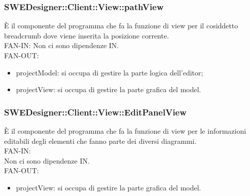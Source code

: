 \documentclass[../DefinizioneDiProdotto.tex]{subfiles}
\begin{document}
				\subsubsection{SWEDesigner::Client::View::pathView}
				È il componente del programma che fa la funzione di view per il cosiddetto breadcrumb dove viene inserita la posizione corrente.\\
					FAN-IN:
					Non ci sono dipendenze IN. \\
					FAN-OUT:
					\begin{itemize}
						\item projectModel: si occupa di gestire la parte logica dell'editor;
						\item projectView: si occupa di gestire la parte grafica del model.
					\end{itemize}
				
				\subsubsection{SWEDesigner::Client::View::EditPanelView}
				È il componente del programma che fa la funzione di view per le informazioni editabili degli elementi che fanno parte dei diversi diagrammi.\\
					FAN-IN:\\
					Non ci sono dipendenze IN. \\
					FAN-OUT:
					\begin{itemize}
						\item projectView: si occupa di gestire la parte grafica del model.
					\end{itemize}
			
\end{document}
